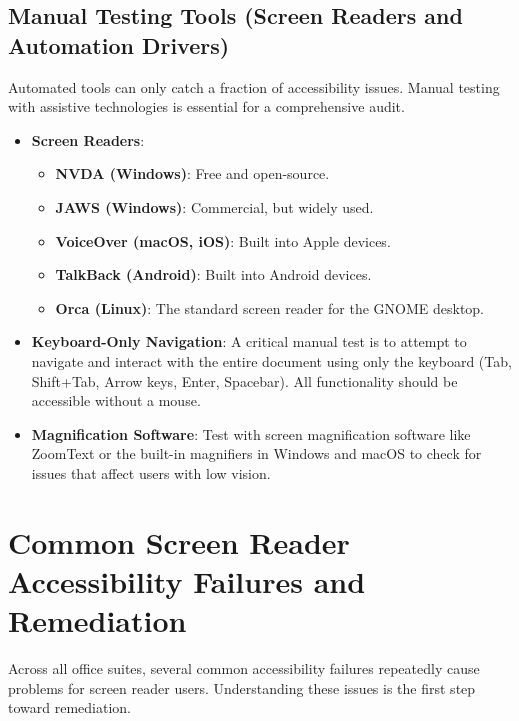 \subsection{Manual Testing Tools (Screen Readers and Automation Drivers)}
\label{subsec:manual-testing-tools}
Automated tools can only catch a fraction of accessibility issues. Manual testing with assistive technologies is essential for a comprehensive audit.
\begin{itemize}
	\item \textbf{Screen Readers}:
	      \begin{itemize}
		      \item \textbf{NVDA (Windows)}: Free and open-source.
		      \item \textbf{JAWS (Windows)}: Commercial, but widely used.
		      \item \textbf{VoiceOver (macOS, iOS)}: Built into Apple devices.
		      \item \textbf{TalkBack (Android)}: Built into Android devices.
		      \item \textbf{Orca (Linux)}: The standard screen reader for the GNOME desktop.
	      \end{itemize}
	\item \textbf{Keyboard-Only Navigation}: A critical manual test is to attempt to navigate and interact with the entire document using only the keyboard (Tab, Shift+Tab, Arrow keys, Enter, Spacebar). All functionality should be accessible without a mouse.
	\item \textbf{Magnification Software}: Test with screen magnification software like ZoomText or the built-in magnifiers in Windows and macOS to check for issues that affect users with low vision.
\end{itemize}

\section{Common Screen Reader Accessibility Failures and Remediation}
\label{sec:common-failures-remediation}

Across all office suites, several common accessibility failures repeatedly cause problems for screen reader users. Understanding these issues is the first step toward remediation.

